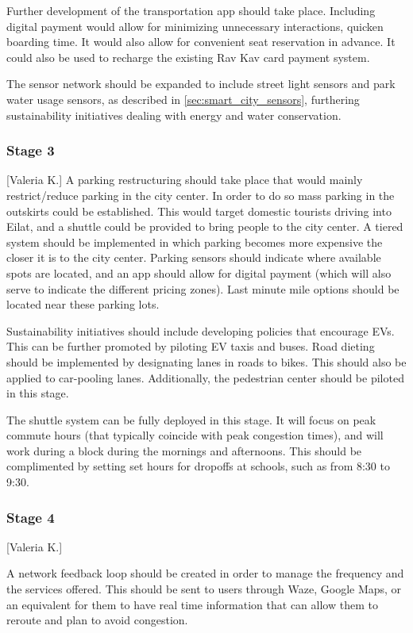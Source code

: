 \documentclass[12pt]{article}                               %
\begin{document}
Further development of the transportation app should take place. Including digital payment would allow for minimizing unnecessary interactions, quicken boarding time. It would also allow for convenient seat reservation in advance. It could also be used to recharge the existing Rav Kav card payment system.

The sensor network should be expanded to include street light sensors and park water usage sensors, as described in \ref{sec:smart_city_sensors}, furthering sustainability initiatives dealing with energy and water conservation.

\subsubsection{Stage 3}[Valeria K.]
A parking restructuring should take place that would mainly restrict/reduce parking in the city center. In order to do so mass parking in the outskirts could be established. This would target domestic tourists driving into Eilat, and a shuttle could be provided to bring people to the city center. A tiered system should be implemented in which parking becomes more expensive the closer it is to the city center. Parking sensors should indicate where available spots are located, and an app should allow for digital payment (which will also serve to indicate the different pricing zones). Last minute mile options should be located near these parking lots.

Sustainability initiatives should include developing policies that encourage EVs. This can be further promoted by piloting EV taxis and buses. Road dieting should be implemented by designating lanes in roads to bikes. This should also be applied to car-pooling lanes. Additionally, the pedestrian center should be piloted in this stage.

The shuttle system can be fully deployed in this stage. It will focus on peak commute hours (that typically coincide with peak congestion times), and will work during a block during the mornings and afternoons. This should be complimented by setting set hours for dropoffs at schools, such as from 8:30 to 9:30.

\subsubsection{Stage 4}[Valeria K.]

A network feedback loop should be created in order to manage the frequency and the services offered. This should be sent to users through Waze, Google Maps, or an equivalent for them to have real time information that can allow them to reroute and plan to avoid congestion.
\end{document}
